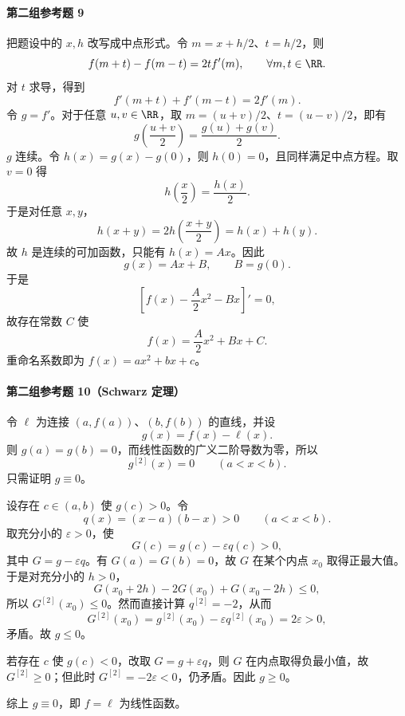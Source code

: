 \paragraph{第二组参考题 9}
\begin{xsolution}
把题设中的 $x,h$ 改写成中点形式。令 $m=x+h/2$、$t=h/2$，则
\[
  f(m+t)-f(m-t)=2t f'(m),
  \qquad\forall m,t\in\RR.
\]
对 $t$ 求导，得到
\[
  f'(m+t)+f'(m-t)=2f'(m).
\]
令 $g=f'$。对于任意 $u,v\in\RR$，取 $m=(u+v)/2$、$t=(u-v)/2$，即有
\[
  g\left(\frac{u+v}{2}\right)=\frac{g(u)+g(v)}2.
\]
$g$ 连续。令 $h(x)=g(x)-g(0)$，则 $h(0)=0$，且同样满足中点方程。取 $v=0$ 得
\[
  h\left(\frac x2\right)=\frac{h(x)}2.
\]
于是对任意 $x,y$，
\[
  h(x+y)=2h\left(\frac{x+y}{2}\right)=h(x)+h(y).
\]
故 $h$ 是连续的可加函数，只能有 $h(x)=Ax$。因此
\[
  g(x)=Ax+B,
  \qquad B=g(0).
\]
于是
\[
  \left[f(x)-\frac A2x^2-Bx\right]'=0,
\]
故存在常数 $C$ 使
\[
  f(x)=\frac A2x^2+Bx+C.
\]
重命名系数即为 $f(x)=ax^2+bx+c$。
\end{xsolution}

\paragraph{第二组参考题 10（Schwarz 定理）}
\begin{xsolution}
令 $\ell$ 为连接 $(a,f(a))$、$(b,f(b))$ 的直线，并设
\[
  g(x)=f(x)-\ell(x).
\]
则 $g(a)=g(b)=0$，而线性函数的广义二阶导数为零，所以
\[
  g^{[2]}(x)=0\qquad(a<x<b).
\]
只需证明 $g\equiv0$。

设存在 $c\in(a,b)$ 使 $g(c)>0$。令
\[
  q(x)=(x-a)(b-x)>0\qquad(a<x<b).
\]
取充分小的 $\varepsilon>0$，使
\[
  G(c)=g(c)-\varepsilon q(c)>0,
\]
其中 $G=g-\varepsilon q$。有 $G(a)=G(b)=0$，故 $G$ 在某个内点 $x_0$ 取得正最大值。于是对充分小的 $h>0$，
\[
  G(x_0+2h)-2G(x_0)+G(x_0-2h)\leqslant0,
\]
所以 $G^{[2]}(x_0)\leqslant0$。然而直接计算 $q^{[2]}=-2$，从而
\[
  G^{[2]}(x_0)=g^{[2]}(x_0)-\varepsilon q^{[2]}(x_0)=2\varepsilon>0,
\]
矛盾。故 $g\leqslant0$。

若存在 $c$ 使 $g(c)<0$，改取 $G=g+\varepsilon q$，则 $G$ 在内点取得负最小值，故 $G^{[2]}\geqslant0$；但此时 $G^{[2]}=-2\varepsilon<0$，仍矛盾。因此 $g\geqslant0$。

综上 $g\equiv0$，即 $f=\ell$ 为线性函数。
\end{xsolution}

